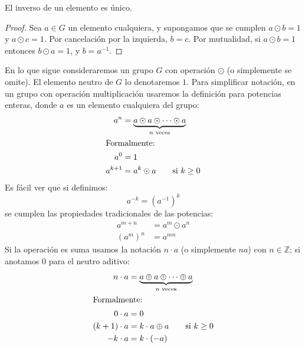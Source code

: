   \begin{theorem}
    \label{theo:group-inverse-unique}
    El inverso de un elemento es único.
  \end{theorem}
  \begin{proof}
    Sea \(a \in G\) un elemento cualquiera,
    y supongamos que se cumplen \(a \odot b = 1\) y \(a \odot c = 1\).
    Por cancelación por la izquierda,
    \(b = c\).
    Por mutualidad,
    si \(a \odot b = 1\) entonces \(b \odot a = 1\),
    y \(b = a^{-1}\).
  \end{proof}

  En lo que sigue consideraremos un grupo \(G\) con operación \(\odot\)
  (o simplemente se omite).
  El elemento neutro de \(G\) lo denotaremos \(1\).
  Para simplificar notación,
  en un grupo con operación multiplicación
  usaremos la definición para potencias enteras,%
  donde \(a\) es un elemento cualquiera del grupo:
  \begin{align}
    a^n
      &= \underbrace{a \odot a \odot \dotsm \odot a}_{\text{\(n\) veces}}
	   \notag \\
  \intertext{Formalmente:}
    a^0
      &= 1 \label{eq:definicion-a^0} \\
    a^{k + 1}
      &= a^k \odot a \qquad \text{si \(k \ge 0\)}
	   \label{eq:definicion-a^k}
  \end{align}
  Es fácil ver que si definimos:
  \begin{equation}
    \label{definicion-a^-k}
    a^{-k}
      = \left( a^{-1} \right)^k
  \end{equation}
  se cumplen las propiedades tradicionales de las potencias:
  \begin{align}
    a^{m + n}
      &= a^m \odot a^n \label{eq:propiedad-potencias-+} \\
    (a^m)^n
      &= a^{m n}       \label{eq:propiedad-potencias-*}
  \end{align}
  Si la operación es suma
  usamos la notación \(n \cdot a\)
  (o simplemente \(n a\))
  con \(n \in \mathbb{Z}\);
  si anotamos \(0\) para el neutro aditivo:
  \begin{align*}
    n \cdot a
      &= \underbrace{a \oplus a \oplus \dotsb \oplus a}_{\text{\(n\) veces}}
	   \notag \\
  \intertext{Formalmente:}
    0 \cdot a
      &= 0 \\
    (k + 1) \cdot a
      &= k \cdot a \oplus a \qquad \text{si \(k \ge 0\)} \\
    -k \cdot a
      &= k \cdot (-a)
  \end{align*}

